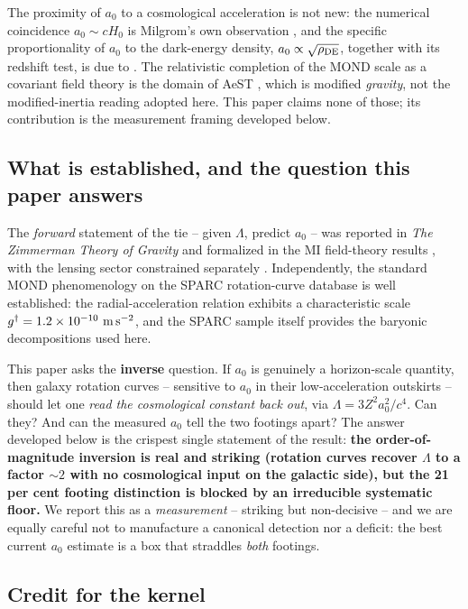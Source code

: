 \documentclass[fleqn,usenatbib]{mnras}
\begin{document}
The proximity of $a_0$ to a cosmological acceleration is not new: the numerical coincidence $a_0\sim cH_0$ is Milgrom's own observation \citep{Milgrom1983}, and the specific proportionality of $a_0$ to the dark-energy density, $a_0\propto\sqrt{\rho_{\rm DE}}$, together with its redshift test, is due to \citet{Limbach2008}. The relativistic completion of the MOND scale as a covariant field theory is the domain of AeST \citep{Skordis2021}, which is modified \emph{gravity}, not the modified-inertia reading adopted here. This paper claims none of those; its contribution is the measurement framing developed below.

\subsection{What is established, and the question this paper answers}
\label{sec:question}

The \emph{forward} statement of the tie -- given $\Lambda$, predict $a_0$ -- was reported in \textit{The Zimmerman Theory of Gravity} and formalized in the MI field-theory results \citep{Zimmerman2026a}, with the lensing sector constrained separately \citep{Zimmerman2026b}. Independently, the standard MOND phenomenology on the SPARC rotation-curve database is well established: the radial-acceleration relation \citep[RAR;][]{McGaugh2016} exhibits a characteristic scale $g^\dagger=1.2\times10^{-10}\ {\rm m\,s^{-2}}$, and the SPARC sample itself \citep{Lelli2016} provides the baryonic decompositions used here.

This paper asks the \textbf{inverse} question. If $a_0$ is genuinely a horizon-scale quantity, then galaxy rotation curves -- sensitive to $a_0$ in their low-acceleration outskirts -- should let one \emph{read the cosmological constant back out}, via $\Lambda=3Z^2 a_0^2/c^4$. Can they? And can the measured $a_0$ tell the two footings apart? The answer developed below is the crispest single statement of the result: \textbf{the order-of-magnitude inversion is real and striking (rotation curves recover $\Lambda$ to a factor ${\sim}2$ with no cosmological input on the galactic side), but the 21 per cent footing distinction is blocked by an irreducible systematic floor.} We report this as a \emph{measurement} -- striking but non-decisive -- and we are equally careful not to manufacture a canonical detection nor a deficit: the best current $a_0$ estimate is a box that straddles \emph{both} footings.

\subsection{Credit for the kernel}
\label{sec:credit}
\end{document}

